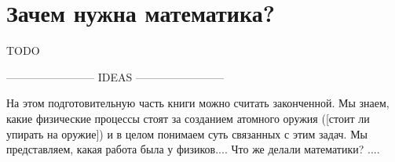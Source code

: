 \chapter{Зачем нужна математика?}

TODO

------------------------ IDEAS ------------------------ 

На этом подготовительную часть книги можно считать законченной.
Мы знаем, какие физические процессы стоят за созданием атомного оружия ([стоит ли упирать на оружие]) и в целом понимаем суть связанных с этим задач.
Мы представляем, какая работа была у физиков....
Что же делали математики? ....
